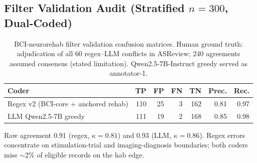 \subsection{Filter Validation Audit (Stratified \texorpdfstring{$n=300$}{n=300}, Dual-Coded)}
\begin{table}[htbp]
\caption{BCI-neurorehab filter validation confusion matrices. Human ground truth: adjudication of all 60 regex--LLM conflicts in ASReview; 240 agreements assumed consensus (stated limitation). Qwen2.5-7B-Instruct greedy served as annotator-1.}
\label{tab:filter_audit}
\small
\begin{tabular}{lrrrrrr}
\toprule
Coder & TP & FP & FN & TN & Prec. & Rec. \\
\midrule
Regex v2 (BCI-core + anchored rehab) & 110 & 25 & 3 & 162 & 0.81 & 0.97 \\
LLM Qwen2.5-7B greedy & 111 & 19 & 2 & 168 & 0.85 & 0.98 \\
\bottomrule
\end{tabular}
\end{table}
Raw agreement 0.91 (regex, $\kappa = 0.81$) and 0.93 (LLM, $\kappa = 0.86$). Regex errors concentrate on stimulation-trial and imaging-diagnosis boundaries; both coders miss $\sim$2\% of eligible records on the hab edge.
